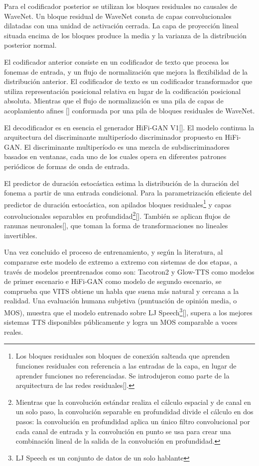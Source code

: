 Para el codificador posterior se utilizan los bloques residuales no causales de WaveNet. Un bloque residual de WaveNet consta de capas convolucionales dilatadas con una unidad de activación cerrada. La capa de proyección lineal situada encima de los bloques produce la media y la varianza de la distribución posterior normal.

El codificador anterior consiste en un codificador de texto que procesa los fonemas de entrada, y un flujo de normalización que mejora la flexibilidad de la distribución anterior. El codificador de texto es un codificador transformador que utiliza representación posicional relativa en lugar de la codificación posicional absoluta. Mientras que el flujo de normalización es una pila de capas de acoplamiento afines [\cite{dinh2016density}] conformada por una pila de bloques residuales de WaveNet. 

El decodificador es en esencia el generador HiFi-GAN V1[\cite{kong2020hifi}]. El modelo continua la arquitectura del discriminante multiperíodo discriminador propuesto en HiFi-GAN. El discriminante multiperíodo es una mezcla de subdiscriminadores basados en ventanas, cada uno de los cuales opera en diferentes patrones periódicos de formas de onda de entrada.

El predictor de duración estocástica estima la distribución de la duración del fonema a partir de una entrada condicional. Para la parametrización eficiente del predictor de duración estocástica, son apilados bloques residuales\footnote{Los bloques residuales son bloques de conexión salteada que aprenden funciones residuales con referencia a las entradas de la capa, en lugar de aprender funciones no referenciadas. Se introdujeron como parte de la arquitectura de las redes residuales[\cite{he2016deep}].} y capas convolucionales separables en profundidad\footnote{Mientras que la convolución estándar realiza el cálculo espacial y de canal en un solo paso, la convolución separable en profundidad divide el cálculo en dos pasos: la convolución en profundidad aplica un único filtro convolucional por cada canal de entrada y la convolución en punto se usa para crear una combinación lineal de la salida de la convolución en profundidad.}[\cite{chollet2017xception}]. También se aplican flujos de ranunas neuronales[\cite{durkan2019neural}], que toman la forma de transformaciones no lineales invertibles. 

Una vez concluido el proceso de entrenamiento, y según la literatura, al compararse este modelo de extremo a extremo con sistemas de dos etapas, a través de modelos preentrenados como son: Tacotron2 y Glow-TTS como modelos de primer escenario e HiFi-GAN como modelo de segundo escenario, se comprueba que VITS obtiene un habla que suena más natural y cercana a la realidad. Una evaluación humana subjetiva (puntuación de opinión media, o MOS), muestra que el modelo entrenado sobre LJ Speech\footnote{LJ Speech es un conjunto de datos de un solo hablante}[\cite{ljspeech}], supera a los mejores sistemas TTS disponibles públicamente y logra un MOS comparable a voces reales.

